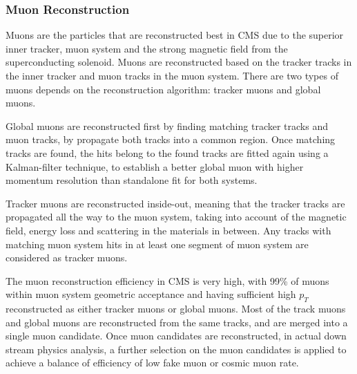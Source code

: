 \subsubsection*{Muon Reconstruction}
Muons are the particles that are reconstructed best in CMS due to the superior inner tracker, muon system and the strong magnetic field from the superconducting solenoid. Muons are reconstructed based on the tracker tracks in the inner tracker and muon tracks in the muon system. There are two types of muons depends on the reconstruction algorithm: tracker muons and global muons.\cite{CMS_muon}

Global muons are reconstructed first by finding matching tracker tracks and muon tracks, by propagate both tracks into a common region. Once matching tracks are found, the hits belong to the found tracks are fitted again using a Kalman-filter technique, to establish a better global muon with higher momentum resolution than standalone fit for both systems.

Tracker muons are reconstructed inside-out, meaning that the tracker tracks are propagated all the way to the muon system, taking into account of the magnetic field, energy loss and scattering in the materials in between. Any tracks with matching muon system hits in at least one segment of muon system are considered as tracker muons.

The muon reconstruction efficiency in CMS is very high, with 99\% of muons within muon system geometric acceptance and having sufficient high $p_T$ reconstructed as either tracker muons or global muons. Most of the track muons and global muons are reconstructed from the same tracks, and are merged into a single muon candidate. Once muon candidates are reconstructed, in actual down stream physics analysis, a further selection on the muon candidates is applied to achieve a balance of efficiency of low fake muon or cosmic muon rate.

